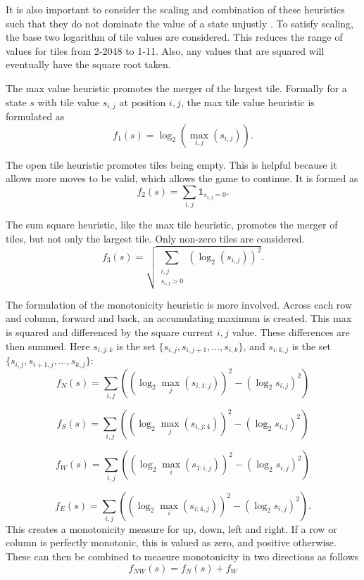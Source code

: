 \documentclass[conference]{IEEEtran}
\begin{document}
It is also important to consider the scaling and combination of these heuristics such that they do not dominate the value of a state unjustly \cite{ai, d}. To satisfy scaling, the base two logarithm of tile values are considered. This reduces the range of values for tiles from 2-2048
to 1-11. Also, any values that are squared will eventually have the square root taken. 

The max value heuristic promotes the merger of the largest tile. Formally for a state $s$ with tile value $s_{i,j}$ at position $i,j$, the max tile value heuristic is formulated as
$$ f_{1}(s) = \log_2\left(\max_{i,j}\left(s_{i,j}\right)\right). $$ 

The open tile heuristic promotes tiles being empty. This is helpful because it allows more moves to be valid, which allows the game to continue. It is formed as
$$ f_{2}(s) = \sum_{i,j}\mathds{1}_{s_{i,j} = 0}. $$

The sum square heuristic, like the max tile heuristic, promotes the merger of tiles, but not only the largest tile. Only non-zero tiles are considered.
$$ f_{3}(s) = \sqrt{\sum_{\substack{i,j \\ s_{i,j} > 0}} \left(\log_2\left( s_{i,j}\right)\right)^2}. $$

The formulation of the monotonicity heuristic is more involved. Across each row and column, forward and back, an accumulating maximum is created. This max is squared and differenced by the square current $i,j$ value. These differences are then summed. Here $s_{i,j:k}$ is the set $\{ s_{i,j}, s_{i,j+1}, \dots , s_{i,k} \}$, and $s_{i:k,j}$ is the set $\{ s_{i,j}, s_{i+1,j}, \dots , s_{k,j} \}$:
$$ f_{N}(s) = \sum_{i,j}\left(\left(\log_2\max_{j}\left(s_{i,1:j}\right)\right)^2 - \left(\log_2s_{i,j}\right)^2\right) $$

$$ f_{S}(s) = \sum_{i,j}\left(\left(\log_2\max_{j}\left(s_{i,j:4}\right)\right)^2 - \left(\log_2s_{i,j}\right)^2\right) $$

$$ f_{W}(s) = \sum_{i,j}\left(\left(\log_2\max_{i}\left(s_{1:i,j}\right)\right)^2 - \left(\log_2s_{i,j}\right)^2\right) $$

$$ f_{E}(s) = \sum_{i,j}\left(\left(\log_2\max_{i}\left(s_{i:4,j}\right)\right)^2 - \left(\log_2s_{i,j}\right)^2\right). $$
This creates a monotonicity measure for up, down, left and right. If a row or column is perfectly monotonic, this is valued as zero, and positive otherwise. These can then be combined to measure monotonicity in two directions as follows
$$f_{NW}(s) = f_{N}(s) + f_{W}$$
\end{document}
